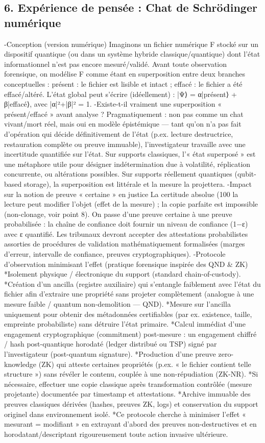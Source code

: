 \documentclass[]{article}
\begin{document}
\subsection*{6. Expérience de pensée : Chat de Schrödinger numérique}
-Conception (version numérique)
Imaginons un fichier numérique F stocké sur un dispositif quantique (ou dans un système hybride classique/quantique) dont l’état informationnel n’est pas encore mesuré/validé. Avant toute observation forensique, on modélise F comme étant en superposition entre deux branches conceptuelles :
présent : le fichier est lisible et intact ;
effacé : le fichier a été effacé/altéré.
L’état global peut s’écrire (idéellement) :
|Ψ⟩ = α|présent⟩ + β|effacé⟩, avec |α|²+|β|² = 1.
-Existe-t-il vraiment une superposition « présent/effacé » avant analyse ?
Pragmatiquement : non pas comme un chat vivant/mort réel, mais oui en modèle épistémique — tant qu’on n’a pas fait d’opération qui décide définitivement de l’état (p.ex. lecture destructrice, restauration complète ou preuve immuable), l’investigateur travaille avec une incertitude quantifiée sur l’état. Sur supports classiques, l’« état superposé » est une métaphore utile pour désigner indétermination due à volatilité, réplication concurrente, ou altérations possibles. Sur supports réellement quantiques (qubit-based storage), la superposition est littérale et la mesure la projettera.
-Impact sur la notion de preuve « certaine » en justice
La certitude absolue (100 %
la lecture peut modifier l’objet (effet de la mesure) ;
la copie parfaite est impossible (non-clonage, voir point 8).
On passe d’une preuve certaine à une preuve probabilisée : la chaîne de confiance doit fournir un niveau de confiance (1−ε) avec ε quantifié. Les tribunaux devront accepter des attestations probabilistes assorties de procédures de validation mathématiquement formalisées (marges d’erreur, intervalle de confiance, preuves cryptographiques).
-Protocole d’observation minimisant l’effet (pratique forensique inspirée des QND \& ZK)
*Isolement physique / électronique du support (standard chain-of-custody).
*Création d’un ancilla (registre auxiliaire) qui s’entangle faiblement avec l’état du fichier afin d’extraire une propriété sans projeter complètement (analogue à une mesure faible / quantum non-demolition — QND).
*Mesure sur l’ancilla uniquement pour obtenir des métadonnées certifiables (par ex. existence, taille, empreinte probabiliste) sans détruire l’état primaire.
*Calcul immédiat d’une engagement cryptographique (commitment) post-mesure : un engagement chiffré / hash post-quantique horodaté (ledger distribué ou TSP) signé par l’investigateur (post-quantum signature).
*Production d’une preuve zero-knowledge (ZK) qui atteste certaines propriétés (p.ex. « le fichier contient telle structure ») sans révéler le contenu, couplée à une non-répudiation (ZK-NR).
*Si nécessaire, effectuer une copie classique après transformation contrôlée (mesure projetante) documentée par timestamp et attestations.
*Archive immuable des preuves classiques dérivées (hashes, preuves ZK, logs) et conservation du support originel dans environnement isolé.
*Ce protocole cherche à minimiser l’effet « mesurant = modifiant » en extrayant d’abord des preuves non-destructives et en horodatant/descriptant rigoureusement toute action invasive ultérieure.
\end{document}

